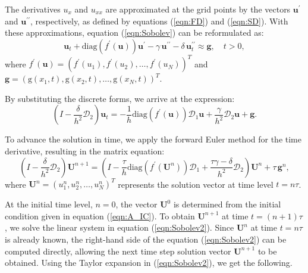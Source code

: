 \documentclass[11pt,a4paper]{amsart}
\theoremstyle{plain}
\theoremstyle{definition}
\theoremstyle{remark}
\numberwithin{equation}{section}
\begin{document}
The derivatives $ u_x $ and $ u_{xx} $ are approximated at the grid points by the vectors $ \mathbf{u^{\prime}} $ and $ \mathbf{u^{\prime\prime}} $, respectively, as defined by equations (\ref{eqn:FD}) and (\ref{eqn:SD}). With these approximations, equation (\ref{eqn:Sobolev}) can be reformulated as:
\begin{equation}
    \mathbf{u}_t + \text{diag}(f^{\prime}(\mathbf{u})) \mathbf{u}^{\prime} - \gamma \, \mathbf{u}^{\prime\prime} - \delta \, \mathbf{u}^{\prime\prime}_t \approx \mathbf{g}, \quad t > 0,
\end{equation}
where $ f^{\prime}(\mathbf{u}) = (f^{\prime}(u_1), f^{\prime}(u_2), \dots, f^{\prime}(u_N))^T $ and $ \mathbf{g} = (\mathrm{g}(x_1, t), \mathrm{g}(x_2, t), \dots, \mathrm{g}(x_N, t))^T $.
\par
By substituting the discrete forms, we arrive at the expression:
\begin{equation}
    \left( I - \dfrac{\delta}{h^2} \mathcal{D}_2 \right) \mathbf{u}_t = -\dfrac{1}{h} \text{diag}(f^{\prime}(\mathbf{u})) \mathcal{D}_1 \mathbf{u} + \dfrac{\gamma}{h^2} \mathcal{D}_2 \mathbf{u} + \mathbf{g}.
\end{equation}
\par
To advance the solution in time, we apply the forward Euler method for the time derivative, resulting in the matrix equation:
\begin{equation}
\label{eqn:Sobolev2}
    \left( I - \dfrac{\delta}{h^2} \mathcal{D}_2 \right) \mathbf{U}^{n+1} = \left( I - \dfrac{\tau}{h} \text{diag}(f^{\prime}(\mathbf{U}^n)) \mathcal{D}_1 + \dfrac{\tau \gamma- \delta}{h^2} \mathcal{D}_2 \right) \mathbf{U}^n + \tau \, \mathbf{g}^n,
\end{equation}
where $ \mathbf{U}^n = (u_1^n, u_2^n, \dots, u_N^n)^T $ represents the solution vector at time level $ t = n \tau $.
\par
At the initial time level, $ n = 0 $, the vector $ \mathbf{U}^0 $ is determined from the initial condition given in equation (\ref{eqn:A_IC}). To obtain $ \mathbf{U}^{n+1} $ at time $ t = (n+1) \tau $, we solve the linear system in equation (\ref{eqn:Sobolev2}). Since $ \mathbf{U}^n $ at time $ t = n \tau $ is already known, the right-hand side of the equation (\ref{eqn:Sobolev2}) can be computed directly, allowing the next time step solution vector $ \mathbf{U}^{n+1} $ to be obtained. Using the Taylor expansion in (\ref{eqn:Sobolev2}), we get the following.
\end{document}
